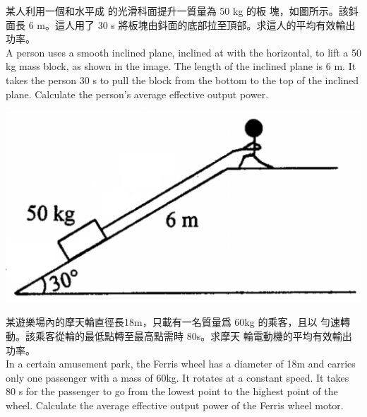 \documentclass[beamer=true]{standalone}
\begin{document}
\begin{eg}
    某人利用一個和水平成  的光滑科面提升一質量為 50 kg 的板 塊，如圖所示。該鈄面長 6 m。這人用了 30 s 將板塊由鈄面的底部拉至頂部。求這人的平均有效輸出功率。\\A person uses a smooth inclined plane, inclined at   with the horizontal, to lift a 50 kg mass block, as shown in the image. The length of the inclined plane is 6 m. It takes the person 30 s to pull the block from the bottom to the top of the inclined plane. Calculate the person's average effective output power.
        {\par\centering
            \includegraphics[width=.4\textwidth]{assets/188224a3.png}
            \par}

\end{eg}

\begin{eg}

\end{eg}

\begin{eg}
    某遊樂場內的摩天輪直徑長18m，只載有一名質量爲 60kg 的乘客，且以 勻速轉動。該乘客從輪的最低點轉至最高點需時 80s。求摩天 輪電動機的平均有效輸出功率。\\In a certain amusement park, the Ferris wheel has a diameter of 18m and carries only one passenger with a mass of 60kg. It rotates at a constant speed. It takes 80 s for the passenger to go from the lowest point to the highest point of the wheel. Calculate the average effective output power of the Ferris wheel motor.
\end{eg}
\end{document}
